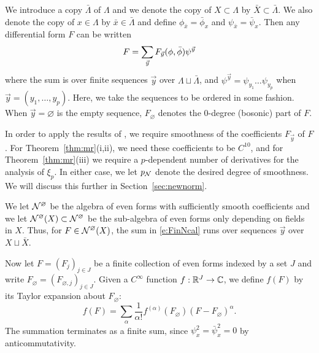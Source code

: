 We introduce a copy $\bar\Lambda$ of $\Lambda$
and we denote the copy of $X \subset \Lambda$ by $\bar X \subset \bar\Lambda$.
We also denote the copy of $x \in \Lambda$
by $\bar x \in \bar\Lambda$ and define $\phi_{\bar x} = \bar\phi_x$ and $\psi_{\bar x} = \bar\psi_x$.
Then any differential form $F$ can be written
\begin{equation}
\lbeq{FinNcal}
F
=
\sum_{\vec y}
F_{\vec y} (\phi, \bar\phi)
\psi^{\vec y}
\end{equation}
where the sum is over finite sequences $\vec y$ over $\Lambda\sqcup\bar\Lambda$,
and $\psi^{\vec y} = \psi_{y_1} \ldots \psi_{y_p}$
when $\vec y = (y_1, \ldots, y_p)$. Here, we take the sequences to be ordered in
some  fashion. When $\vec y = \varnothing$ is the empty sequence,
$F_\varnothing$ denotes the $0$-degree (bosonic) part of $F$.

In order to apply the results of \cite{BBS-saw4-log,BBS-saw4,BSTW-clp}, we require
smoothness of the coefficients $F_{\vec y}$ of $F$.  For Theorem~\ref{thm:mr}(i,ii),
we need these coefficients to be $C^{10}$, and for Theorem~\ref{thm:mr}(iii) we require
a $p$-dependent number of derivatives for the analysis of $\xi_p$.
In either case, we let $p_{\mathcal{N}}$ denote the desired degree of smoothness.
We will discuss this further in Section~\ref{sec:newnorm}.

We let $\mathcal{N}^\varnothing$ be the algebra of even forms with sufficiently smooth coefficients
and we let $\mathcal{N}^\varnothing(X) \subset \mathcal{N}^\varnothing$ be the sub-algebra of even forms only depending on fields
in $X$. Thus, for $F \in \mathcal{N}^\varnothing(X)$, the sum in \eqref{e:FinNcal} runs over sequences $\vec y$
over $X \sqcup \bar X$.

Now let $F = (F_j)_{j \in J}$ be a finite collection of even forms
indexed by a set $J$
and write $F_\varnothing = (F_{\varnothing,j})_{j \in J}$.
Given a $C^\infty$ function $f : {\mathbb R}^J \rightarrow \mathbb{C}$, we define
$f(F)$ by its Taylor expansion about $F_\varnothing$:
\begin{equation}
f(F) = \sum_\alpha \frac{1}{\alpha!} f^{(\alpha)}(F_\varnothing) (F - F_\varnothing)^\alpha.
\end{equation}
The summation terminates as a finite sum, since $\psi_x^2 = \bar\psi_x^2 = 0$
by anticommutativity.

